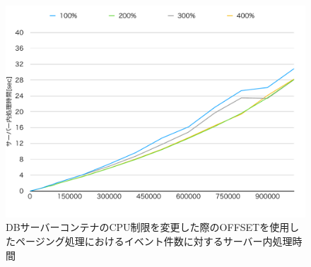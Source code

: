 \documentclass[../../../../../main]{subfiles}
\begin{document}
    \begin{figure}[H]
        \centering
        \includegraphics[width=12cm]{graph}
        \caption{DBサーバーコンテナのCPU制限を変更した際のOFFSETを使用したページング処理におけるイベント件数に対するサーバー内処理時間}
        \label{fig:paging-offset-change-db-cpu-limit-server-time-app_4_8192-db_1024}
    \end{figure}
\end{document}
